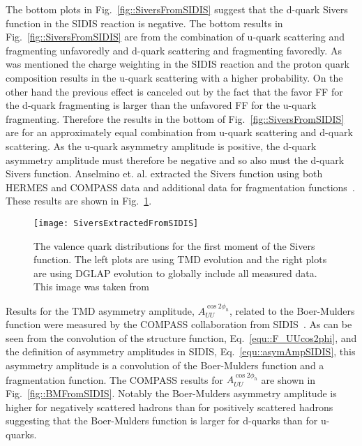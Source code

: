 The bottom plots in Fig.~\ref{fig::SiversFromSIDIS} suggest that the d-quark
Sivers function in the SIDIS reaction is negative.  The bottom results in
Fig.~\ref{fig::SiversFromSIDIS} are from the combination of u-quark scattering
and fragmenting unfavoredly and d-quark scattering and fragmenting favoredly.
As was mentioned the charge weighting in the SIDIS reaction and the proton quark
composition results in the u-quark scattering with a higher probability.  On the
other hand the previous effect is canceled out by the fact that the favor FF for
the d-quark fragmenting is larger than the unfavored FF for the u-quark
fragmenting.  Therefore the results in the bottom of
Fig.~\ref{fig::SiversFromSIDIS} are for an approximately equal combination from
u-quark scattering and d-quark scattering.  As the u-quark asymmetry amplitude
is positive, the d-quark asymmetry amplitude must therefore be negative and so
also must the d-quark Sivers function.  Anselmino et. al. extracted the Sivers
function using both HERMES and COMPASS data and additional data for
fragmentation functions~\cite{PhysRevD.86.014028}.  These results are shown in
Fig.~\ref{fig::SiversExtractedFromSIDIS}.

\begin{figure}[h!t]
  \centering \texttt{[image: SiversExtractedFromSIDIS]}
  \caption{The valence quark distributions for the first moment of the Sivers
    function.  The left plots are using TMD evolution and the right plots are
    using DGLAP evolution to globally include all measured data.  This image was
    taken from~\cite{PhysRevD.86.014028}}
  \label{fig::SiversExtractedFromSIDIS}
\end{figure}

Results for the TMD asymmetry amplitude, $A_{UU}^{\cos 2\phi_h}$, related to the
Boer-Mulders function were measured by the COMPASS collaboration from
SIDIS~\cite{Adolph:2014pwc}.  As can be seen from the convolution of the
structure function, Eq.~\ref{equ::F_UUcos2phi}, and the definition of asymmetry
amplitudes in SIDIS, Eq.~\ref{equ::asymAmpSIDIS}, this asymmetry amplitude is a
convolution of the Boer-Mulders function and a fragmentation function.  The
COMPASS results for $A_{UU}^{\cos 2\phi_h}$ are shown in
Fig.~\ref{fig::BMFromSIDIS}.  Notably the Boer-Mulders asymmetry amplitude is
higher for negatively scattered hadrons than for positively scattered hadrons
suggesting that the Boer-Mulders function is larger for d-quarks than for
u-quarks.

